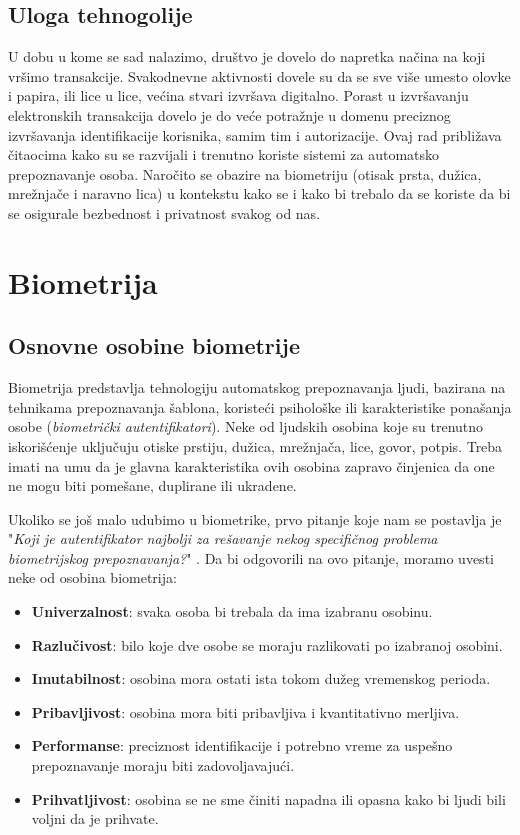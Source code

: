 \documentclass[11pt, a4paper]{article}
\begin{document}
\subsection{Uloga tehnogolije}

U dobu u kome se sad nalazimo, društvo je dovelo do napretka načina na koji vršimo transakcije. Svakodnevne aktivnosti dovele su da se sve više umesto olovke i papira, ili lice u lice, većina stvari izvršava digitalno. Porast u izvršavanju elektronskih transakcija dovelo je do veće potražnje u domenu preciznog izvršavanja identifikacije korisnika, samim tim i autorizacije. Ovaj rad približava čitaocima kako su se razvijali i trenutno koriste sistemi za automatsko prepoznavanje osoba. Naročito se obazire na biometriju (otisak prsta, dužica, mrežnjače i naravno lica) u kontekstu kako se i kako bi trebalo da se koriste da bi se osigurale bezbednost i privatnost svakog od nas.
\break


\section{Biometrija}

\subsection{Osnovne osobine biometrije}
Biometrija predstavlja tehnologiju automatskog prepoznavanja ljudi, bazirana na tehnikama prepoznavanja šablona, koristeći psihološke ili karakteristike ponašanja osobe (\textit{biometrički autentifikatori}). Neke od ljudskih osobina koje su trenutno iskorišćenje uključuju otiske prstiju, dužica, mrežnjača, lice, govor, potpis. Treba imati na umu da je glavna karakteristika ovih osobina zapravo činjenica da one ne mogu biti pomešane, duplirane ili ukradene. 

Ukoliko se još malo udubimo u biometrike, prvo pitanje koje nam se postavlja je "\textit{Koji je autentifikator najbolji za rešavanje nekog specifičnog problema biometrijskog prepoznavanja?}" \cite{G1}. Da bi odgovorili na ovo pitanje, moramo uvesti neke od osobina biometrija:

\begin{itemize}
    \item \textbf{Univerzalnost}: svaka osoba bi trebala da ima izabranu osobinu.
    \item \textbf{Razlučivost}: bilo koje dve osobe se moraju razlikovati po izabranoj osobini.
    \item \textbf{Imutabilnost}: osobina mora ostati ista tokom dužeg vremenskog perioda.
    \item \textbf{Pribavljivost}: osobina mora biti pribavljiva i kvantitativno merljiva.
    \item \textbf{Performanse}: preciznost identifikacije i potrebno vreme za uspešno prepoznavanje moraju biti zadovoljavajući.
    \item \textbf{Prihvatljivost}: osobina se ne sme činiti napadna ili opasna kako bi ljudi bili voljni da je prihvate.
\end{itemize}
\end{document}
